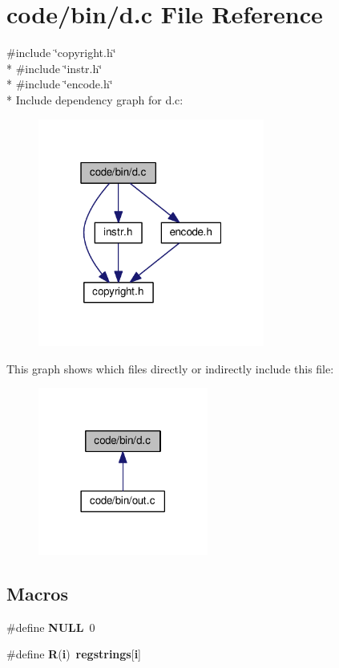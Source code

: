 \section{code/bin/d.c File Reference}
\label{d_8c}
{\ttfamily \#include \char`\"{}copyright.\+h\char`\"{}}\\*
{\ttfamily \#include \char`\"{}instr.\+h\char`\"{}}\\*
{\ttfamily \#include \char`\"{}encode.\+h\char`\"{}}\\*
Include dependency graph for d.\+c\+:
\nopagebreak
\begin{figure}[H]
\begin{center}
\leavevmode
\includegraphics[width=211pt]{d_8c__incl}
\end{center}
\end{figure}
This graph shows which files directly or indirectly include this file\+:
\nopagebreak
\begin{figure}[H]
\begin{center}
\leavevmode
\includegraphics[width=158pt]{d_8c__dep__incl}
\end{center}
\end{figure}
\subsection*{Macros}
\begin{DoxyCompactItemize}
\item 
\#define {\bf N\+U\+LL}~0
\item 
\#define {\bf R}({\bf i})~{\bf regstrings}[{\bf i}]
\end{DoxyCompactItemize}
